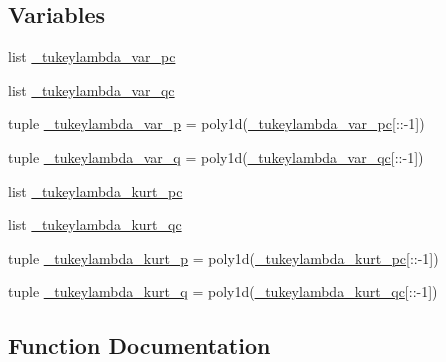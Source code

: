 \subsection*{Variables}
\begin{DoxyCompactItemize}
\item 
list \hyperlink{namespacescipy_1_1stats_1_1__tukeylambda__stats_aab4deaecc63977072b318727f8f49cc1}{\+\_\+tukeylambda\+\_\+var\+\_\+pc}
\item 
list \hyperlink{namespacescipy_1_1stats_1_1__tukeylambda__stats_a466b2c42e10ec832fe5839ecddf29044}{\+\_\+tukeylambda\+\_\+var\+\_\+qc}
\item 
tuple \hyperlink{namespacescipy_1_1stats_1_1__tukeylambda__stats_a40019a60ee1e0688ddfb01a54ba693d7}{\+\_\+tukeylambda\+\_\+var\+\_\+p} = poly1d(\hyperlink{namespacescipy_1_1stats_1_1__tukeylambda__stats_aab4deaecc63977072b318727f8f49cc1}{\+\_\+tukeylambda\+\_\+var\+\_\+pc}\mbox{[}\+::-\/1\mbox{]})
\item 
tuple \hyperlink{namespacescipy_1_1stats_1_1__tukeylambda__stats_a1897d6d27e16fe00a37d2e3ad8a95fce}{\+\_\+tukeylambda\+\_\+var\+\_\+q} = poly1d(\hyperlink{namespacescipy_1_1stats_1_1__tukeylambda__stats_a466b2c42e10ec832fe5839ecddf29044}{\+\_\+tukeylambda\+\_\+var\+\_\+qc}\mbox{[}\+::-\/1\mbox{]})
\item 
list \hyperlink{namespacescipy_1_1stats_1_1__tukeylambda__stats_a475925acf85e7ee0f1875793f2d336c7}{\+\_\+tukeylambda\+\_\+kurt\+\_\+pc}
\item 
list \hyperlink{namespacescipy_1_1stats_1_1__tukeylambda__stats_ab4e409fa96770e89cefeacb192388961}{\+\_\+tukeylambda\+\_\+kurt\+\_\+qc}
\item 
tuple \hyperlink{namespacescipy_1_1stats_1_1__tukeylambda__stats_ae6c95f6cf16eadc2582abc76cb4959a2}{\+\_\+tukeylambda\+\_\+kurt\+\_\+p} = poly1d(\hyperlink{namespacescipy_1_1stats_1_1__tukeylambda__stats_a475925acf85e7ee0f1875793f2d336c7}{\+\_\+tukeylambda\+\_\+kurt\+\_\+pc}\mbox{[}\+::-\/1\mbox{]})
\item 
tuple \hyperlink{namespacescipy_1_1stats_1_1__tukeylambda__stats_acc6f2e4f32724a25a99585e8421f9840}{\+\_\+tukeylambda\+\_\+kurt\+\_\+q} = poly1d(\hyperlink{namespacescipy_1_1stats_1_1__tukeylambda__stats_ab4e409fa96770e89cefeacb192388961}{\+\_\+tukeylambda\+\_\+kurt\+\_\+qc}\mbox{[}\+::-\/1\mbox{]})
\end{DoxyCompactItemize}


\subsection{Function Documentation}
\hypertarget{namespacescipy_1_1stats_1_1__tukeylambda__stats_a9f2c7eb01929288b76c504279ce275e3}{}
